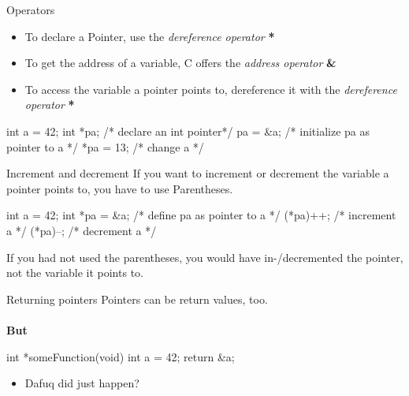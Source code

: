 \documentclass[10pt,graphics,aspectratio=169,table]{beamer}
\begin{document}
\begin{frame}[fragile]{Operators}
	\begin{itemize}
		\item To declare a Pointer, use the \textit{dereference operator} \textbf{*}
		\item To get the address of a variable, C offers the \textit{address operator} \textbf{\&}
		\item To access the variable a pointer points to, dereference it with the \textit{dereference operator} \textbf{*}
	\end{itemize}
	\begin{codeblock}[numbers=none]

int a = 42;
int *pa;	/* declare an int pointer*/
pa = &a;	/* initialize pa as pointer to a */
*pa = 13;	/* change a */
\end{codeblock}
\end{frame}

\begin{frame}[fragile]{Increment and decrement}
	If you want to increment or decrement the variable a pointer points to, you have to use Parentheses.
	\begin{codeblock}[numbers=none]
int a = 42;
int *pa = &a;	/* define pa as pointer to a */
(*pa)++;		/* increment a */
(*pa)--;		/* decrement a */
\end{codeblock}

If you had not used the parentheses, you would have in-/decremented the pointer, not the variable it points to. 
\end{frame}

\begin{frame}[fragile]{Returning pointers}
Pointers can be return values, too.\\\ \\
\textbf{But} 
	\begin{codeblock}[numbers=none]
int *someFunction(void) {	
	int a = 42;
	return &a;
}
\end{codeblock}
	\begin{itemize}
		\item Dafuq did just happen?
	\end{itemize}
\end{frame}
\end{document}
